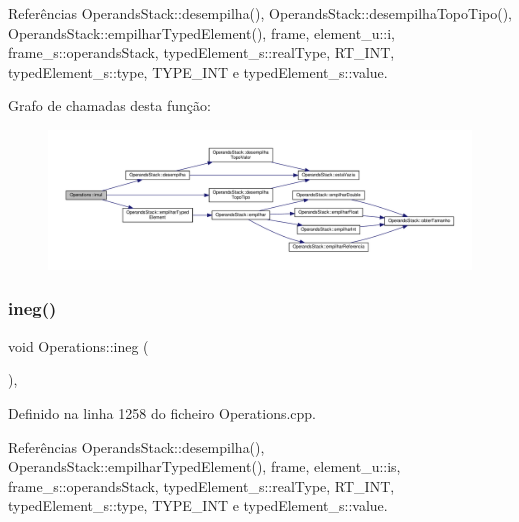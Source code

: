 Referências Operands\+Stack\+::desempilha(), Operands\+Stack\+::desempilha\+Topo\+Tipo(), Operands\+Stack\+::empilhar\+Typed\+Element(), frame, element\+\_\+u\+::i, frame\+\_\+s\+::operands\+Stack, typed\+Element\+\_\+s\+::real\+Type, R\+T\+\_\+\+I\+NT, typed\+Element\+\_\+s\+::type, T\+Y\+P\+E\+\_\+\+I\+NT e typed\+Element\+\_\+s\+::value.

Grafo de chamadas desta função\+:
\nopagebreak
\begin{figure}[H]
\begin{center}
\leavevmode
\includegraphics[width=350pt]{classOperations_a01b2ffdd380327b31b03657eb99b8a81_cgraph}
\end{center}
\end{figure}
\mbox{\label{classOperations_a819d5dd66c64a6801a1599b5abf81ae7}} 
\subsubsection{\texorpdfstring{ineg()}{ineg()}}
{\footnotesize\ttfamily void Operations\+::ineg (\begin{DoxyParamCaption}{ }\end{DoxyParamCaption})\hspace{0.3cm}{\ttfamily [static]}, {\ttfamily [private]}}



Definido na linha 1258 do ficheiro Operations.\+cpp.



Referências Operands\+Stack\+::desempilha(), Operands\+Stack\+::empilhar\+Typed\+Element(), frame, element\+\_\+u\+::is, frame\+\_\+s\+::operands\+Stack, typed\+Element\+\_\+s\+::real\+Type, R\+T\+\_\+\+I\+NT, typed\+Element\+\_\+s\+::type, T\+Y\+P\+E\+\_\+\+I\+NT e typed\+Element\+\_\+s\+::value.

